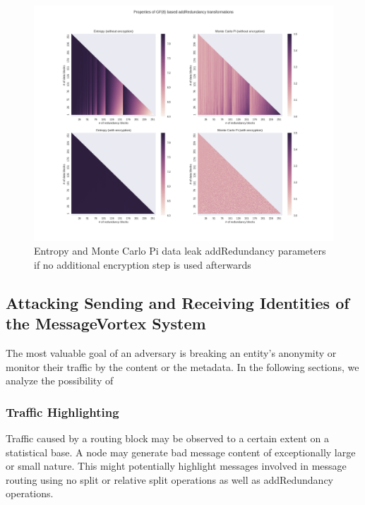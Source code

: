 \begin{figure}[ht]
	\includegraphics[width=\textwidth]{inc/randomblock_10kb}
	\caption{Entropy and Monte Carlo Pi data leak addRedundancy parameters if no additional encryption step is used afterwards}
	\label{fig:randomBlockAnalysis}
\end{figure}

\subsection{Attacking Sending and Receiving Identities of the MessageVortex System}
The most valuable goal of an adversary is breaking an entity's anonymity or monitor their traffic by the content or the metadata. In the following sections, we analyze the possibility of 


\subsubsection{Traffic Highlighting}
Traffic caused by a routing block may be observed to a certain extent on a statistical base. A node may generate bad message content of exceptionally large or small nature. This might potentially highlight messages involved in message routing using no split or relative split operations as well as addRedundancy operations.

